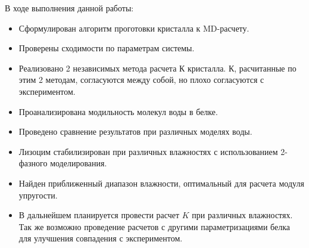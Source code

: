 \conclusion

В ходе выполнения данной работы:

\begin{itemize}
\item Сформулирован алгоритм проготовки кристалла к MD-расчету. 

\item Проверены сходимости по параметрам системы. 

\item Реализовано 2 независимых метода расчета К кристалла. К, расчитанные по этим 2 методам, согласуются между собой, но плохо согласуются с экспериментом.

\item Проанализирована модильность молекул воды в белке.

\item Проведено сравнение результатов при различных моделях воды.

\item Лизоцим стабилизирован при различных влажностях с использованием 2-фазного моделирования.  

\item Найден приближенный диапазон влажности, оптимальный для расчета модуля упругости. 

\item В дальнейшем планируется провести расчет $K$ при различных влажностях. Так же возможно проведение расчетов с другими параметризациями белка для улучшения совпадения с экспериментом.

\end{itemize}

